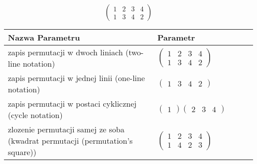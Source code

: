 \documentclass[12pt]{article}
\begin{document}
\subsection{}
\begin{center}
\[
\begin{pmatrix}
	1 & 2 & 3 & 4 \\ 
	1 & 3 & 4 & 2 
\end{pmatrix}
\]

\begin{tabular}{|m{0.6\linewidth}|m{0.4\linewidth}|}
	\hline
	Nazwa Parametru & Parametr \\
	\hline
	zapis permutacji w dwoch liniach (two-line notation) & $\begin{pmatrix} 1 & 2 & 3 & 4 \\ 
1 & 3 & 4 & 2 \end{pmatrix}$ \\ 
	\hline
	zapis permutacji w jednej linii (one-line notation) & $\begin{pmatrix} 1 & 3 & 4 & 2 \end{pmatrix}$ \\ 
	\hline
	zapis permutacji w postaci cyklicznej (cycle notation) & $\begin{pmatrix} 1 \end{pmatrix} \begin{pmatrix} 2 & 3 & 4 \end{pmatrix} $ \\ 
	\hline
	zlozenie permutacji samej ze soba (kwadrat permutacji (permutation's square)) & $\begin{pmatrix} 1 & 2 & 3 & 4 \\ 
1 & 4 & 2 & 3 \end{pmatrix}$ \\ 
	\hline
\end{tabular}
\end{center}
\end{document}

